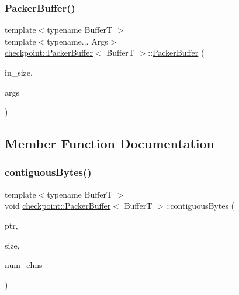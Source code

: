 \mbox{\label{structcheckpoint_1_1_packer_buffer_aded90d4aacc6376a95579d249751496d}} 
\subsubsection{\texorpdfstring{Packer\+Buffer()}{PackerBuffer()}\hspace{0.1cm}{\footnotesize\ttfamily [3/3]}}
{\footnotesize\ttfamily template$<$typename BufferT $>$ \\
template$<$typename... Args$>$ \\
\hyperlink{structcheckpoint_1_1_packer_buffer}{checkpoint\+::\+Packer\+Buffer}$<$ BufferT $>$\+::\hyperlink{structcheckpoint_1_1_packer_buffer}{Packer\+Buffer} (\begin{DoxyParamCaption}\item[{\hyperlink{namespacecheckpoint_a083f6674da3f94c2901b18c6d238217c}{Serial\+Size\+Type} const \&}]{in\+\_\+size,  }\item[{Args \&\&...}]{args }\end{DoxyParamCaption})\hspace{0.3cm}{\ttfamily [explicit]}}



\subsection{Member Function Documentation}
\mbox{\label{structcheckpoint_1_1_packer_buffer_aa8bf2d721f834a607a48164086aec078}} 
\subsubsection{\texorpdfstring{contiguous\+Bytes()}{contiguousBytes()}}
{\footnotesize\ttfamily template$<$typename BufferT $>$ \\
void \hyperlink{structcheckpoint_1_1_packer_buffer}{checkpoint\+::\+Packer\+Buffer}$<$ BufferT $>$\+::contiguous\+Bytes (\begin{DoxyParamCaption}\item[{void $\ast$}]{ptr,  }\item[{\hyperlink{namespacecheckpoint_a083f6674da3f94c2901b18c6d238217c}{Serial\+Size\+Type}}]{size,  }\item[{\hyperlink{namespacecheckpoint_a083f6674da3f94c2901b18c6d238217c}{Serial\+Size\+Type}}]{num\+\_\+elms }\end{DoxyParamCaption})}

